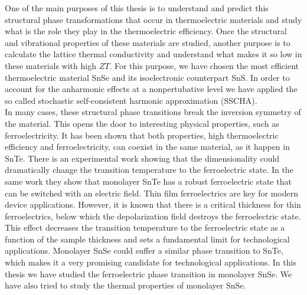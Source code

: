 One of the main purposes of this thesis is to understand and predict this structural phase transformations that occur 
in thermoelectric materials and study what is the role they play in the thermoelectric efficiency. Once the 
structural and vibrational properties of these materials are studied, another purpose is to calculate the lattice 
thermal conductivity and understand what makes it so low in these materials with high $ZT$. For this purpose, we have 
chosen the most efficient thermoelectric material SnSe and its isoelectronic counterpart SnS. In order to account 
for the anharmonic effects at a nonpertubative level we have applied the so called stochastic self-consistent 
harmonic approximation\cite{errea2013first,errea2014anharmonic,bianco2017second,monacelli2018pressure} (SSCHA). \\

In many cases, these structural phase transitions break the inversion symmetry of the 
material\cite{ribeiro2018strong,chang2016discovery}. This opens the door to interesting physical properties, such 
as ferroelectricity. It has been shown that both properties, high thermoelectric efficiency and ferroelectricity, 
can coexist in the same material, as it happen in SnTe\cite{ribeiro2018strong,zhang2013high}. There is an 
experimental work\cite{chang2016discovery} showing that the dimensionality could dramatically change the transition 
temperature to the ferroelectric state. In the same work\cite{chang2016discovery} they show that 
monolayer SnTe has a robust ferroelectric state that can be switched with an electric field. Thin film ferroelectrics 
are key for modern device applications\cite{lallart2011ferroelectrics}. However, it is known that there is a critical 
thickness for thin ferroelectrics, below which the depolarization field destroys the ferroelectric 
state\cite{batra1973new,zhong1994giant,dawber2005physics}. This effect decreases the transition temperature to the 
ferroelectric state as a function of the sample thickness\cite{fong2004ferroelectricity,fong2006stabilization} and 
sets a fundamental limit for technological applications. Monolayer SnSe could suffer a similar phase transition to 
SnTe, which makes it a very promising candidate for technological applications. In this thesis we have studied 
the ferroelectric phase transition in monolayer SnSe\cite{chang2020controlled}. We have also tried to study the 
thermal properties of monolayer SnSe. \\

